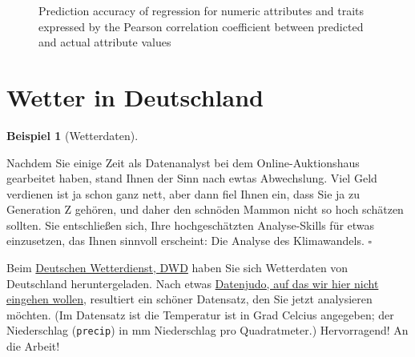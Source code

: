 \documentclass[
  letterpaper,
  oneside,
  open=any]{scrbook}
\theoremstyle{definition}
\theoremstyle{definition}
\newtheorem{example}{Beispiel}[chapter]
\theoremstyle{definition}
\theoremstyle{remark}
\begin{document}
\begin{figure}


\caption{\label{fig-pnas1}Prediction accuracy of regression for numeric
attributes and traits expressed by the Pearson correlation coefficient
between predicted and actual attribute values}

\end{figure}%

\section{Wetter in Deutschland}\label{wetter-in-deutschland}

\begin{example}[Wetterdaten]\protect\hypertarget{exm-wetterdaten}{}\label{exm-wetterdaten}

Nachdem Sie einige Zeit als Datenanalyst bei dem Online-Auktionshaus
gearbeitet haben, stand Ihnen der Sinn nach ewtas Abwechslung. Viel Geld
verdienen ist ja schon ganz nett, aber dann fiel Ihnen ein, dass Sie ja
zu Generation Z gehören, und daher den schnöden Mammon nicht so hoch
schätzen sollten. Sie entschließen sich, Ihre hochgeschätzten
Analyse-Skills für etwas einzusetzen, das Ihnen sinnvoll erscheint: Die
Analyse des Klimawandels. \(\square\)

\end{example}

Beim \href{https://www.dwd.de/DE/Home/home_node.html}{Deutschen
Wetterdienst, DWD} haben Sie sich Wetterdaten von Deutschland
heruntergeladen. Nach etwas
\href{https://data-se.netlify.app/2022/07/24/preparing-german-weather-data/}{Datenjudo,
auf das wir hier nicht eingehen wollen,} resultiert ein schöner
Datensatz, den Sie jetzt analysieren möchten. (Im Datensatz ist die
Temperatur ist in Grad Celcius angegeben; der Niederschlag
(\texttt{precip}) in mm Niederschlag pro Quadratmeter.) Hervorragend! An
die Arbeit!
\end{document}
